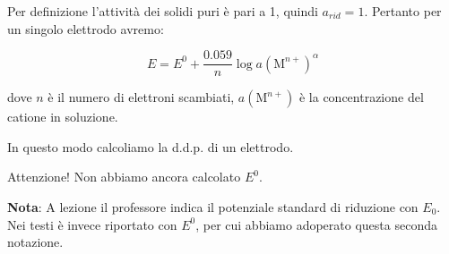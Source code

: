 \vspace{0.2cm}Per definizione l'attività dei solidi puri è pari a 1, quindi $a_{rid}=1$. Pertanto per un singolo elettrodo avremo:

$$E = E^0 + \frac{0.059}{n}\log a{(\text{M}^{n+})}^{\alpha}$$

dove $n$ è il numero di elettroni scambiati, $a(\text{M}^{n+})$ è la concentrazione del catione in soluzione.

In questo modo calcoliamo la d.d.p. di un elettrodo.

\vspace{0.2cm}Attenzione! Non abbiamo ancora calcolato $E^0$.

\vspace{0.2cm}\textbf{Nota}: A lezione il professore indica il potenziale standard di riduzione con $E_0$. Nei testi è invece riportato con $E^0$, per cui abbiamo adoperato questa seconda notazione.
\vfill